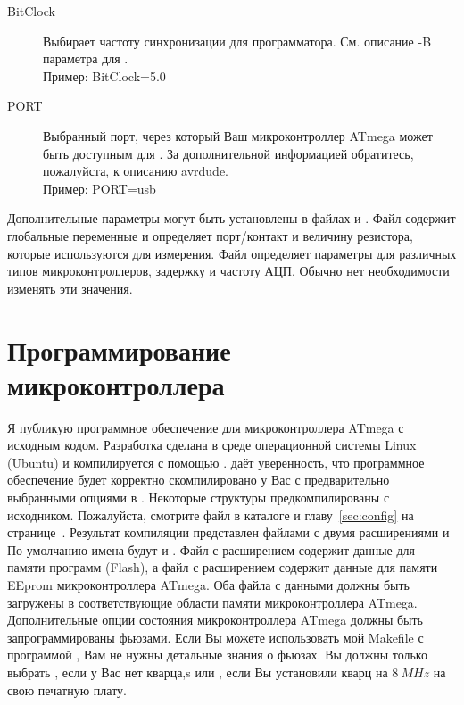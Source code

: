 \begin{description}
  \item[BitClock] Выбирает частоту синхронизации для программатора. См. описание -B параметра для .\\
Пример: BitClock=5.0

  \item[PORT] Выбранный порт, через который Ваш микроконтроллер ATmega может быть доступным для . За 
дополнительной информацией обратитесь, пожалуйста, к описанию avrdude.\\
Пример: PORT=usb

\end{description}

Дополнительные параметры могут быть установлены в файлах  и .
Файл  содержит глобальные переменные и определяет порт/контакт и величину резистора,
которые используются для измерения. Файл  определяет параметры для различных типов микроконтроллеров, задержку и частоту АЦП. Обычно нет 
необходимости изменять эти значения.

\section{Программирование микроконтроллера}
Я публикую программное обеспечение для микроконтроллера ATmega с исходным кодом.
Разработка сделана в среде операционной системы Linux (Ubuntu) и компилируется с помощью .
 даёт уверенность, что программное обеспечение будет корректно скомпилировано
у Вас с предварительно выбранными опциями в .
Некоторые структуры предкомпилированы с исходником.
Пожалуйста, смотрите   файл в каталоге  
и главу~\ref{sec:config} на странице~\pageref{sec:config}.
Результат компиляции представлен файлами с двумя расширениями  и 
По умолчанию имена будут  и .
Файл с расширением  содержит данные для памяти программ (Flash), 
а файл с расширением  содержит данные для памяти EEprom  микроконтроллера ATmega.
Оба файла с данными должны быть загружены в соответствующие области памяти микроконтроллера ATmega.\\

Дополнительные опции состояния микроконтроллера ATmega должны быть запрограммированы фьюзами.
Если Вы можете использовать мой Makefile с программой  \cite{avrdude},
Вам не нужны детальные знания о фьюзах. 
Вы должны только выбрать  , если у Вас нет кварца,s
или  , если Вы установили кварц на \(8~MHz\) на свою печатную плату.


